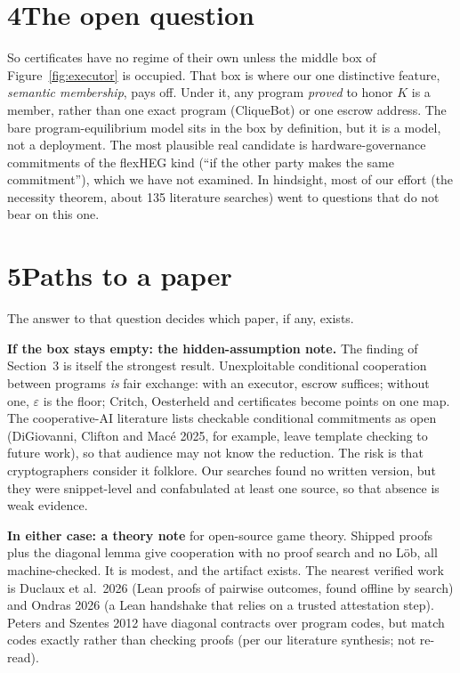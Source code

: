 \documentclass[11pt]{article}
\begin{document}
\section*{4\quad The open question}

So certificates have no regime of their own unless the middle box of Figure~\ref{fig:executor} is occupied. That box is where our one distinctive feature, \emph{semantic membership}, pays off. Under it, any program \emph{proved} to honor $K$ is a member, rather than one exact program (CliqueBot) or one escrow address. The bare program-equilibrium model sits in the box by definition, but it is a model, not a deployment. The most plausible real candidate is hardware-governance commitments of the flexHEG kind (``if the other party makes the same commitment''), which we have not examined. In hindsight, most of our effort (the necessity theorem, about 135 literature searches) went to questions that do not bear on this one.

\section*{5\quad Paths to a paper}

The answer to that question decides which paper, if any, exists.

\textbf{If the box stays empty: the hidden-assumption note.} The finding of Section~3 is itself the strongest result. Unexploitable conditional cooperation between programs \emph{is} fair exchange: with an executor, escrow suffices; without one, $\varepsilon$ is the floor; Critch, Oesterheld and certificates become points on one map. The cooperative-AI literature lists checkable conditional commitments as open (DiGiovanni, Clifton and Macé 2025, for example, leave template checking to future work), so that audience may not know the reduction. The risk is that cryptographers consider it folklore. Our searches found no written version, but they were snippet-level and confabulated at least one source, so that absence is weak evidence.

\textbf{In either case: a theory note} for open-source game theory. Shipped proofs plus the diagonal lemma give cooperation with no proof search and no Löb, all machine-checked. It is modest, and the artifact exists. The nearest verified work is Duclaux et al.\ 2026 (Lean proofs of pairwise outcomes, found offline by search) and Ondras 2026 (a Lean handshake that relies on a trusted attestation step). Peters and Szentes 2012 have diagonal contracts over program codes, but match codes exactly rather than checking proofs (per our literature synthesis; not re-read).
\end{document}
